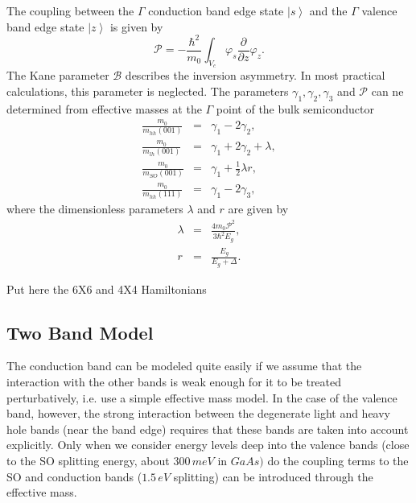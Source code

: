 The coupling between the $\Gamma$ conduction band edge state $\left|s\right\rangle $
and the $\Gamma$ valence band edge state $\left|z\right\rangle $
is given by\begin{equation}
\mathcal{P}=-\frac{\hbar^{2}}{m_{0}}\int_{V_{c}}\varphi_{s}\frac{\partial}{\partial z}\varphi_{z}.\end{equation}
The Kane parameter $\mathcal{B}$ describes the inversion asymmetry.
In most practical calculations, this parameter is neglected. The parameters
$\gamma_{1},\gamma_{2},\gamma_{3}$ and $\mathcal{P}$ can ne determined
from effective masses at the $\Gamma$ point of the bulk semiconductor
\citet{Chuang1995}\begin{eqnarray}
\frac{m_{0}}{m_{hh}(001)} & = & \gamma_{1}-2\gamma_{2},\\
\frac{m_{0}}{m_{lh}(001)} & = & \gamma_{1}+2\gamma_{2}+\lambda,\\
\frac{m_{0}}{m_{SO}(001)} & = & \gamma_{1}+\frac{1}{2}\lambda r,\\
\frac{m_{0}}{m_{hh}(111)} & = & \gamma_{1}-2\gamma_{3},\end{eqnarray}
where the dimensionless parameters $\lambda$ and $r$ are given by\begin{eqnarray}
\lambda & = & \frac{4m_{0}\mathcal{P}^{2}}{3\hbar^{2}E_{g}},\\
r & = & \frac{E_{g}}{E_{g}+\Delta}.\end{eqnarray}


%
\begin{lyxgreyedout}
Put here the 6X6 and 4X4 Hamiltonians
\end{lyxgreyedout}



\subsection{Two Band Model}

The conduction band can be modeled quite easily if we assume that
the interaction with the other bands is weak enough for it to be treated
perturbatively, i.e. use a simple effective mass model. In the case
of the valence band, however, the strong interaction between the degenerate
light and heavy hole bands (near the band edge) requires that these
bands are taken into account explicitly. Only when we consider energy
levels deep into the valence bands (close to the SO splitting energy,
about $300\, meV$ in $GaAs)$ do the coupling terms to the SO and
conduction bands ($1.5\, eV$ splitting) can be introduced through
the effective mass. 

